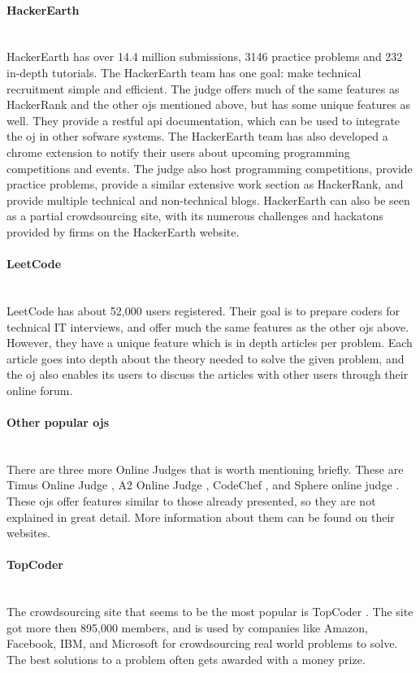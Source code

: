\paragraph*{HackerEarth} \hfill \\
HackerEarth \cite{HACKEREARTH} has over 14.4 million submissions, 3146 practice problems and 232 in-depth tutorials. The HackerEarth team has one goal: make technical recruitment simple and efficient. The judge offers much of the same features as HackerRank and the other \gls{ojs} mentioned above, but has some unique features as well. They provide a \gls{rest}ful \gls{api} documentation, which can be used to integrate the \gls{oj} in other sofware systems. The HackerEarth team has also developed a chrome extension to notify their users about upcoming programming competitions and events. The judge also host programming competitions, provide practice problems, provide a similar extensive work section as HackerRank, and provide multiple technical and non-technical blogs. HackerEarth can also be seen as a partial crowdsourcing site, with its numerous challenges and hackatons provided by firms on the HackerEarth website.

\paragraph*{LeetCode} \hfill \\
LeetCode has about 52,000 users registered. Their goal is to prepare coders for technical IT interviews, and offer much the same features as the other \gls{ojs} above. However, they have a unique feature which is in depth articles per problem. Each article goes into depth about the theory needed to solve the given problem, and the \gls{oj} also enables its users to discuss the articles with other users through their online forum.

\paragraph*{Other popular \gls{ojs}} \hfill \\
There are three more Online Judges that is worth mentioning briefly. These are Timus Online Judge \cite{TIMUS}, A2 Online Judge \cite{A2OJ}, CodeChef \cite{CODECHEF}, and Sphere online judge \cite{SPHERE}. These \gls{ojs} offer features similar to those already presented, so they are not explained in great detail. More information about them can be found on their websites.
\clearpage
\paragraph*{TopCoder} \hfill \\
The crowdsourcing site that seems to be the most popular is TopCoder \cite{TOPCODER}. The site got more then 895,000 members, and is used by companies like Amazon, Facebook, IBM, and Microsoft for crowdsourcing real world problems to solve. The best solutions to a problem often gets awarded with a money prize.

